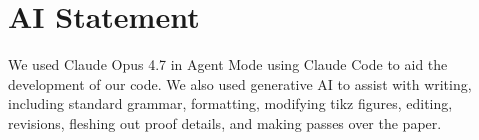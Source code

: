 \section{AI Statement}
\label{sec:acks}

We used Claude Opus 4.7 in Agent Mode using Claude Code to aid the development
of our code. We also used generative AI to assist with writing, including
standard grammar, formatting, modifying tikz figures, editing, revisions,
fleshing out proof details, and making passes over the paper.
